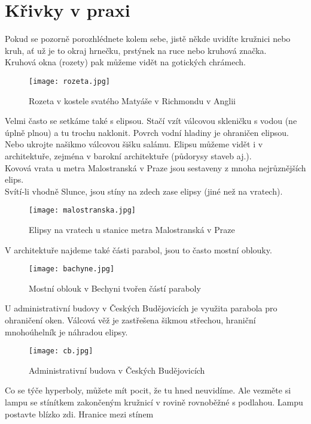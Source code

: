 \chapter{Křivky v praxi}
Pokud se pozorně porozhlédnete kolem sebe, jistě někde uvidíte kružnici nebo kruh, ať už je to okraj hrnečku, prstýnek na ruce
nebo kruhová značka. \\
Kruhová okna (rozety) pak můžeme vidět na gotických chrámech. \\
\begin{figure}[H]
	\centering
	\texttt{[image: rozeta.jpg]}
	\caption{Rozeta v kostele svatého Matyáše v Richmondu v Anglii}
	\label{overflow}
\end{figure}
Velmi často se setkáme také s elipsou. Stačí vzít válcovou skleničku s vodou (ne úplně plnou) a tu trochu naklonit.
Povrch vodní hladiny je ohraničen elipsou. Nebo ukrojte našikmo válcovou šišku salámu. Elipsu můžeme vidět i v architektuře,
zejména v barokní architektuře (půdorysy staveb aj.). \\
Kovová vrata u metra Malostranská v Praze jsou sestaveny z mnoha nejrůznějších elips. \\
Svítí-li vhodně Slunce, jsou stíny na zdech zase elipsy (jiné než na vratech). \\
\begin{figure}[H]
	\centering
	\texttt{[image: malostranska.jpg]}
	\caption{Elipsy na vratech u stanice metra Malostranská v Praze}
	\label{overflow}
\end{figure}
V architektuře najdeme také části parabol, jsou to často mostní oblouky. \\
\begin{figure}[H]
	\centering
	\texttt{[image: bachyne.jpg]}
	\caption{Mostní oblouk v Bechyni tvořen částí paraboly}
	\label{overflow}
\end{figure}
U administrativní budovy v Českých Budějovicích je využita parabola pro ohraničení oken. Válcová věž
je zastřešena šikmou střechou, hraniční mnohoúhelník je náhradou elipsy. \\
\begin{figure}[H]
	\centering
	\texttt{[image: cb.jpg]}
	\caption{Administrativní budova v Českých Budějovicích}
	\label{overflow}
\end{figure}
Co se týče hyperboly, můžete mít pocit, že tu hned neuvidíme. Ale vezměte si lampu se stínítkem
zakončeným kružnicí v rovině rovnoběžné s podlahou. Lampu postavte blízko zdi. Hranice mezi stínem
